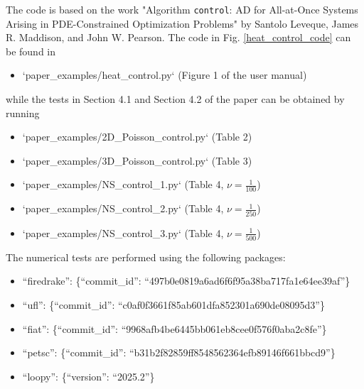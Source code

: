 \documentclass[letterpaper,10pt,english]{sphinxmanual}
\begin{document}
The code is based on the work "Algorithm \texttt{control}: AD for All-at-Once Systems
	Arising in PDE-Constrained Optimization Problems" by Santolo Leveque,
	James R. Maddison, and John W. Pearson. The code in Fig. \ref{heat_control_code} can
	be found in
	\begin{itemize}
		\item `paper{\_}examples/heat{\_}control.py` (Figure 1 of the user manual)
	\end{itemize}
	while the tests in Section 4.1 and Section 4.2 of the paper can be obtained by running
	\begin{itemize}
		\item `paper{\_}examples/2D{\_}Poisson{\_}control.py` (Table 2)
		\item `paper{\_}examples/3D{\_}Poisson{\_}control.py` (Table 3)
		\item `paper{\_}examples/NS{\_}control{\_}1.py` (Table 4, $\nu = \frac{1}{100}$)
		\item `paper{\_}examples/NS{\_}control{\_}2.py` (Table 4, $\nu = \frac{1}{250}$)
		\item `paper{\_}examples/NS{\_}control{\_}3.py` (Table 4, $\nu = \frac{1}{500}$)
	\end{itemize}
	The numerical tests are performed using the following packages:
	\begin{itemize}
		\item ``firedrake'': \{``commit{\_}id'': ``497b0e0819a6ad6f6f95a38ba717fa1e64ee39af''\}
		\item ``ufl'': \{``commit{\_}id'': ``c0af0f3661f85ab601dfa852301a690de08095d3''\}
		\item ``fiat'': \{``commit{\_}id'': ``9968afb4be6445bb061eb8cee0f576f0aba2c8fe''\}
		\item ``petsc'': \{``commit{\_}id'': ``b31b2f82859ff8548562364efb89146f661bbcd9''\}
		\item ``loopy'': \{``version'': ``2025.2''\}
	\end{itemize}
\end{document}
